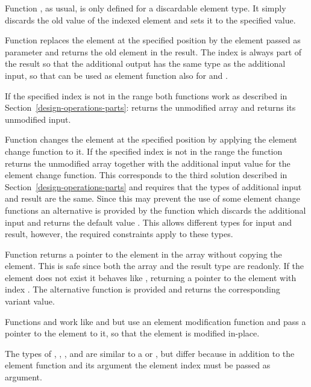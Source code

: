 Function , as usual, is only defined for a discardable element type. 
It simply discards the old value of the indexed element and sets it to the specified value.

Function 
replaces the element at the specified position by the element passed as parameter and returns the old element in the result.
The index is always part of the result so that the additional output has the same type as the additional input,
so that  can be used as element function also for  and .

If the specified
index is not in the range  both functions work as described in Section~\ref{design-operations-parts}:
 returns the unmodified array and  returns its unmodified input.

Function  changes the element at the specified position by applying the element change function
to it. If the specified
index is not in the range  the function returns the unmodified array together with the additional input
value for the element change function. This corresponds to the third solution described in Section~\ref{design-operations-parts}
and requires that the types of additional input and result are the same. Since this may prevent the use of some element
change functions an alternative is provided by the function  which discards the additional
input and returns the default value . This allows different types for input and result, however,
the required constraints apply to these types.

Function  returns a pointer to the element in the array without copying the element. This is safe since 
both the array and the result type are readonly. If the element does not exist it behaves like , returning 
a pointer to the element with index . The alternative function  is provided and returns the 
corresponding variant value.

Functions  and  work like  and  but use an
element modification function and pass a pointer to the element to it, so that the element is modified in-place.

The types of , , , and  are similar to a 
 or , but differ because in addition to the 
element function and its argument the element index must be passed as argument.

